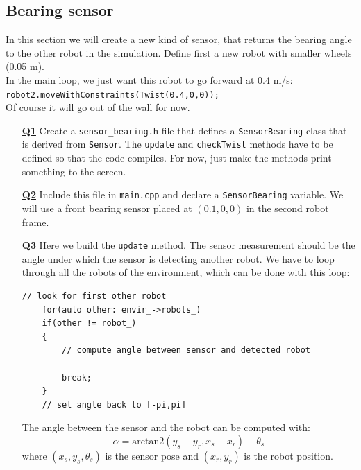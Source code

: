 \documentclass{ecnreport}
\begin{document}
\newpage

\subsection{Bearing sensor}

In this section we will create a new kind of sensor, that returns the bearing angle to the other robot in the simulation.
Define first a new robot with smaller wheels (0.05 m). \\
In the main loop, we just want this robot to go forward at 0.4 m/s: \\\texttt{robot2.moveWithConstraints(Twist(0.4,0,0));}\\
Of course it will go out of the wall for now.

\begin{itemize}
\medskip\item[\textbf{\underline{Q1}}] Create a \texttt{sensor\_bearing.h} file that defines a \texttt{SensorBearing} class that is derived from \texttt{Sensor}. The \texttt{update} and \texttt{checkTwist} methods have to be defined so that the code compiles. For now, just make the methods print something to the screen.

\medskip\item[\textbf{\underline{Q2}}] Include this file in \texttt{main.cpp} and declare a \texttt{SensorBearing} variable.  We will use a front bearing sensor placed at $(0.1, 0,0)$ in the second robot frame.

\medskip\item[\textbf{\underline{Q3}}] Here we build the \texttt{update} method. The sensor measurement should be the angle under which the sensor is detecting another robot. 
We have to loop through all the robots of the environment, which can be done with this loop:
\begin{center}\cppstyle
\begin{lstlisting}
// look for first other robot
    for(auto other: envir_->robots_)
	if(other != robot_)
	{
	    // compute angle between sensor and detected robot
	    
	    break;
	}
    // set angle back to [-pi,pi]
\end{lstlisting}
\end{center}
The angle between the sensor and the robot can be computed with:
\begin{equation*}
 \alpha = \text{arctan2}(y_s - y_r, x_s-x_r) - \theta_s
\end{equation*}where $(x_s,y_s,\theta_s)$ is the sensor pose and $(x_r,y_r)$ is the robot position.


\end{itemize}
\end{document}
